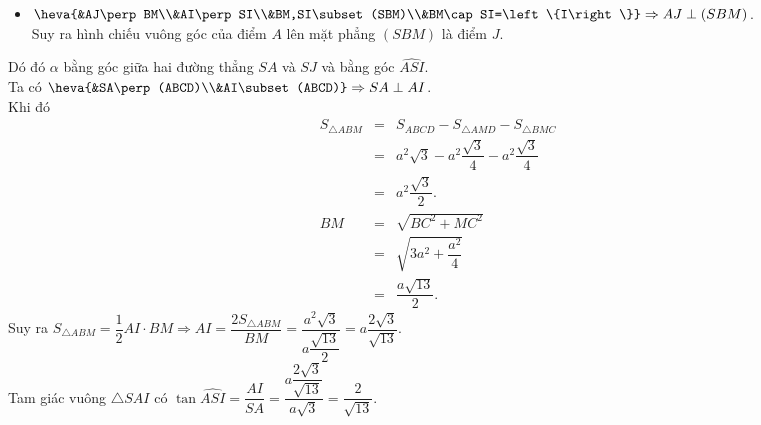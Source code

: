 \begin{ex}
{\begin{itemchoice}
\begin{itemize}
				\item $\heva{&AJ\perp  BM\\&AI\perp SI\\&BM,SI\subset (SBM)\\&BM\cap SI=\left\{I\right\}} \Rightarrow AJ\perp (SBM)$.\\
				\noindent Suy ra hình chiếu vuông góc của điểm $A$  lên mặt phẳng $(SBM)$ là điểm $J$.
			\end{itemize}
			Dó đó $\alpha$ bằng góc giữa hai  đường thẳng $SA$ và $SJ$ và bằng góc $\widehat{ASI}$.\\
			Ta có $\heva{&SA\perp (ABCD)\\&AI\subset (ABCD)} \Rightarrow SA\perp AI$.\\ 
			Khi đó 
			\allowdisplaybreaks 
			\begin{eqnarray*}
				 S_{\triangle ABM}&=&S_{ABCD}-S_{\triangle AMD}-S_{\triangle BMC}\\
				 &=&a^2\sqrt{3}-a^2\dfrac{\sqrt{3}}{4}-a^2\dfrac{\sqrt{3}}{4}\\
				&=&a^2\dfrac{\sqrt{3}}{2}.\\ 
				 BM&=&\sqrt{BC^2+MC^2}\\
				&=&\sqrt{3a^2+\dfrac{a^2}{4}}\\ 
				&=&\dfrac{a\sqrt{13}}{2}. 
			\end{eqnarray*}
			Suy ra $S_{\triangle ABM}=\dfrac{1}{2} AI\cdot  BM\Rightarrow AI=\dfrac{2S_{\triangle ABM}}{BM}=\dfrac{a^2\sqrt{3}}{a\dfrac{\sqrt{13}}{2}}=a\dfrac{2\sqrt{3}}{\sqrt{13}}$.\\
			Tam giác vuông $\triangle SAI$  có $\tan \widehat{ASI}=\dfrac{AI}{SA}=\dfrac{a\dfrac{2\sqrt{3}}{\sqrt{13}}}{a\sqrt{3}}=\dfrac{2}{\sqrt{13}}$.
		\end{itemchoice}
	} 
\end{ex}

